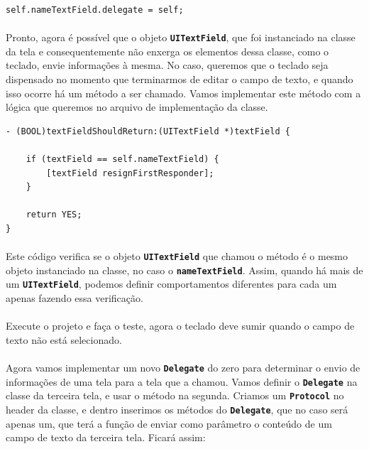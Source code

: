 \documentclass[a4paper,12pt,brazil,doubleside]{book}
\begin{document}
\begin{listing}
\begin{verbatim}
self.nameTextField.delegate = self;
\end{verbatim}
\end{listing}

\paragraph{}Pronto, agora é possível que o objeto \texttt{\textbf{UITextField}}, que foi instanciado na classe da tela e consequentemente não enxerga os elementos dessa classe, como o teclado, envie informações à mesma. No caso, queremos que o teclado seja dispensado no momento que terminarmos de editar o campo de texto, e quando isso ocorre há um método a ser chamado. Vamos implementar este método com a lógica que queremos no arquivo de implementação da classe.

\begin{listing}
\begin{verbatim}
- (BOOL)textFieldShouldReturn:(UITextField *)textField {
    
    if (textField == self.nameTextField) {
        [textField resignFirstResponder];
    }
    
    return YES;
}
\end{verbatim}
\end{listing}

\paragraph{}Este código verifica se o objeto \texttt{\textbf{UITextField}} que chamou o método é o mesmo objeto instanciado na classe, no caso o \texttt{\textbf{nameTextField}}. Assim, quando há mais de um \texttt{\textbf{UITextField}}, podemos definir comportamentos diferentes para cada um apenas fazendo essa verificação.
\paragraph{}Execute o projeto e faça o teste, agora o teclado deve sumir quando o campo de texto não está selecionado.

\paragraph{}Agora vamos implementar um novo \texttt{\textbf{Delegate}} do zero para determinar o envio de informações de uma tela para a tela que a chamou. Vamos definir o \texttt{\textbf{Delegate}} na classe da terceira tela, e usar o método na segunda. Criamos um \texttt{\textbf{Protocol}} no header da classe, e dentro inserimos os métodos do \texttt{\textbf{Delegate}}, que no caso será apenas um, que terá a função de enviar como parâmetro o conteúdo de um campo de texto da terceira tela. Ficará assim:
\end{document}

